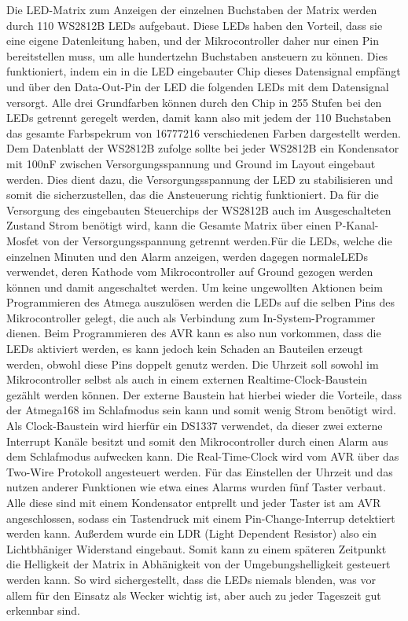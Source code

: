 \documentclass[12pt,journal,compsoc]{IEEEtran}
\begin{document}
Die LED-Matrix zum Anzeigen der einzelnen Buchstaben der Matrix werden durch 110 WS2812B LEDs aufgebaut. Diese LEDs haben den Vorteil, dass sie eine eigene Datenleitung haben, und der Mikrocontroller daher nur einen Pin bereitstellen muss, um alle hundertzehn Buchstaben ansteuern zu können. Dies funktioniert, indem ein in die LED eingebauter Chip dieses Datensignal empfängt und über den Data-Out-Pin der LED die folgenden LEDs mit dem Datensignal versorgt. Alle drei Grundfarben können durch den Chip in 255 Stufen bei den LEDs getrennt geregelt werden, damit kann also mit jedem der 110 Buchstaben das gesamte Farbspekrum von 16777216 verschiedenen Farben dargestellt werden. Dem Datenblatt der WS2812B zufolge sollte bei jeder WS2812B ein Kondensator mit 100nF zwischen Versorgungsspannung und Ground im Layout eingebaut werden. Dies dient dazu, die Versorgungsspannung der  LED zu stabilisieren und somit die sicherzustellen, das die Ansteuerung richtig funktioniert. Da für die Versorgung des eingebauten Steuerchips der WS2812B auch im Ausgeschalteten Zustand Strom benötigt wird, kann die Gesamte Matrix über einen P-Kanal-Mosfet von der Versorgungsspannung getrennt werden.Für die LEDs, welche die einzelnen Minuten und den Alarm anzeigen, werden dagegen \glqq normale\grqq LEDs verwendet, deren Kathode vom Mikrocontroller auf Ground gezogen werden können und damit angeschaltet werden. Um keine ungewollten Aktionen beim Programmieren des Atmega auszulösen werden die LEDs auf die selben Pins des Mikrocontroller gelegt, die auch als Verbindung zum In-System-Programmer dienen. Beim Programmieren des AVR kann es also nun vorkommen, dass  die LEDs aktiviert werden, es kann jedoch kein Schaden an Bauteilen erzeugt werden, obwohl diese Pins doppelt genutz werden.
Die Uhrzeit soll sowohl im Mikrocontroller selbst als auch in einem externen Realtime-Clock-Baustein gezählt werden können. Der externe Baustein hat hierbei wieder die Vorteile, dass der Atmega168 im Schlafmodus sein kann und somit wenig Strom benötigt wird. Als Clock-Baustein wird hierfür ein DS1337 verwendet, da dieser zwei externe Interrupt Kanäle besitzt und somit den Mikrocontroller durch einen Alarm aus dem Schlafmodus aufwecken kann. Die Real-Time-Clock wird vom AVR über das Two-Wire Protokoll angesteuert werden.
Für das Einstellen der Uhrzeit und das nutzen anderer Funktionen wie etwa eines Alarms wurden fünf Taster verbaut. Alle diese sind mit einem Kondensator entprellt und jeder Taster ist am AVR angeschlossen, sodass ein Tastendruck mit einem Pin-Change-Interrup detektiert werden kann. 
Außerdem wurde ein LDR (Light Dependent Resistor) also ein Lichtbhäniger Widerstand eingebaut. Somit kann zu einem späteren Zeitpunkt die Helligkeit der Matrix in Abhänigkeit von der Umgebungshelligkeit gesteuert werden kann. So wird sichergestellt, dass die LEDs niemals blenden, was vor allem für den Einsatz als Wecker wichtig ist, aber auch zu jeder Tageszeit gut erkennbar sind.
\end{document}
